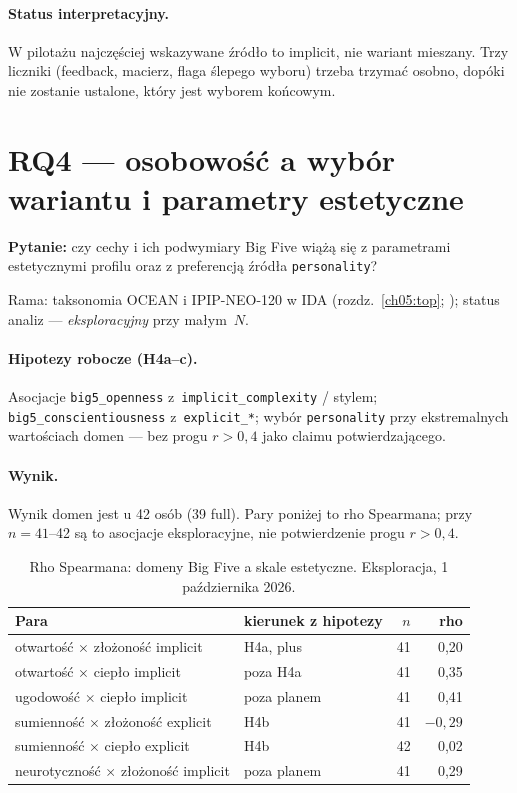 \paragraph{Status interpretacyjny.}
W pilotażu najczęściej wskazywane źródło to implicit, nie wariant mieszany. Trzy liczniki (feedback, macierz, flaga ślepego wyboru) trzeba trzymać osobno, dopóki nie zostanie ustalone, który jest wyborem końcowym.

\section{RQ4 --- osobowość a wybór wariantu i parametry estetyczne}
\label{ch08:sec:rq4}
\label{ch08:sec:personality}

\textbf{Pytanie:} czy cechy i ich podwymiary Big Five wiążą się z parametrami estetycznymi profilu oraz z preferencją źródła \texttt{personality}?

Rama: taksonomia OCEAN i IPIP-NEO-120 w IDA (rozdz.~\ref{ch05:top}; \cite{john2008bigfive}); status analiz --- \emph{eksploracyjny} przy małym~$N$.

\paragraph{Hipotezy robocze (H4a--c).}
Asocjacje \texttt{big5\_openness} z~\texttt{implicit\_complexity} / stylem; \texttt{big5\_conscientiousness} z~\texttt{explicit\_*}; wybór \texttt{personality} przy ekstremalnych wartościach domen --- bez progu $r\!>\!0{,}4$ jako claimu potwierdzającego.

\paragraph{Wynik.}
Wynik domen jest u 42 osób (39 full). Pary poniżej to rho Spearmana; przy $n=41$--42 są to asocjacje eksploracyjne, nie potwierdzenie progu $r>0{,}4$.

\begin{table}[htbp]
  \centering
  \small
  \caption{Rho Spearmana: domeny Big Five a skale estetyczne. Eksploracja, 1 października 2026.}
  \label{tab:ch08:big5}
  \begin{tabular}{llrr}
    \toprule
    Para & kierunek z hipotezy & $n$ & rho \\
    \midrule
    otwartość $\times$ złożoność implicit & H4a, plus & 41 & 0,20 \\
    otwartość $\times$ ciepło implicit & poza H4a & 41 & 0,35 \\
    ugodowość $\times$ ciepło implicit & poza planem & 41 & 0,41 \\
    sumienność $\times$ złożoność explicit & H4b & 41 & $-0{,}29$ \\
    sumienność $\times$ ciepło explicit & H4b & 42 & 0,02 \\
    neurotyczność $\times$ złożoność implicit & poza planem & 41 & 0,29 \\
    \bottomrule
  \end{tabular}
\end{table}

